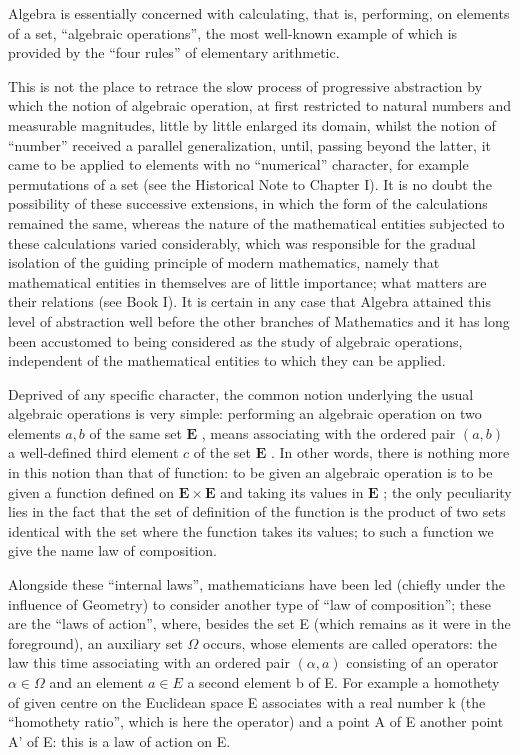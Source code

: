 
Algebra is essentially concerned with calculating, that is, performing, on elements of a set, ``algebraic operations'', the most well-known example of which is provided by the ``four rules'' of elementary arithmetic.

This is not the place to retrace the slow process of progressive abstraction by which the notion of algebraic operation, at first restricted to natural numbers and measurable magnitudes, little by little enlarged its domain, whilst the notion of ``number'' received a parallel generalization, until, passing beyond the latter, it came to be applied to elements with no ``numerical'' character, for example permutations of a set (see the Historical Note to Chapter I). It is no doubt the possibility of these successive extensions, in which the form of the calculations remained the same, whereas the nature of the mathematical entities subjected to these calculations varied considerably, which was responsible for the gradual isolation of the guiding principle of modern mathematics, namely that mathematical entities in themselves are of little importance; what matters are their relations (see Book I). It is certain in any case that Algebra attained this level of abstraction well before the other branches of Mathematics and it has long been accustomed to being considered as the study of algebraic operations, independent of the mathematical entities to which they can be applied.

Deprived of any specific character, the common notion underlying the usual algebraic operations is very simple: performing an algebraic operation on two elements \(a, b\) of the same set \(\mathbf{E}\) , means associating with the ordered pair \((a, b)\) a well-defined third element \(c\) of the set \(\mathbf{E}\) . In other words, there is nothing more in this notion than that of function: to be given an algebraic operation is to be given a function defined on \(\mathbf{E} \times \mathbf{E}\) and taking its values in \(\mathbf{E}\) ; the only peculiarity lies in the fact that the set of definition of the function is the product of two sets identical with the set where the function takes its values; to such a function we give the name law of composition.

Alongside these ``internal laws'', mathematicians have been led (chiefly under the influence of Geometry) to consider another type of ``law of composition''; these are the ``laws of action'', where, besides the set E (which remains as it were in the foreground), an auxiliary set \(\Omega\) occurs, whose elements are called operators: the law this time associating with an ordered pair \((\alpha, a)\) consisting of an operator \(\alpha \in \Omega\) and an element \(a \in E\) a second element b of E. For example a homothety of given centre on the Euclidean space E associates with a real number k (the ``homothety ratio'', which is here the operator) and a point A of E another point A' of E: this is a law of action on E.

